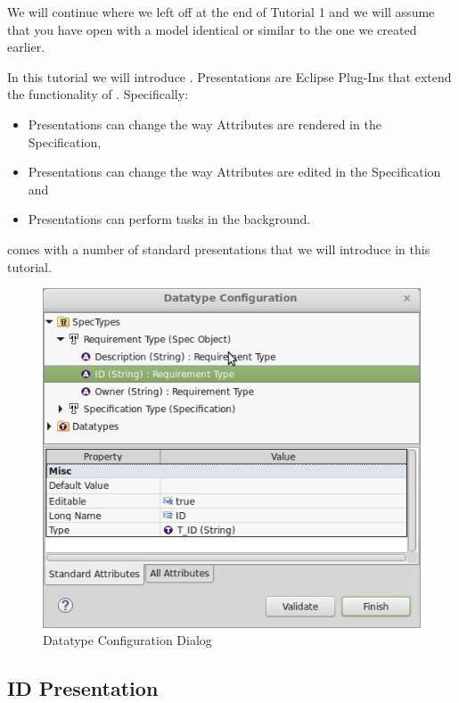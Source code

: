 We will continue where we left off at the end of Tutorial 1 and we will assume that you have \pror{} open with a model identical or similar to the one we created earlier.

In this tutorial we will introduce .  Presentations are Eclipse Plug-Ins that extend the functionality of \pror{}.  Specifically:

\begin{itemize}
\item
  Presentations can change the way Attributes are rendered in the Specification,
\item
  Presentations can change the way Attributes are edited in the Specification and
\item
  Presentations can perform tasks in the background.
\end{itemize}

\pror{} comes with a number of standard presentations that we will introduce in this tutorial.

\begin{figure}
\centering      
\includegraphics[width=0.8\linewidth]{../rmf-images/t_id.png}      
\caption{Datatype Configuration Dialog}      
\label{fig:datatypeConfig}
\end{figure}

\subsection{ID Presentation}

